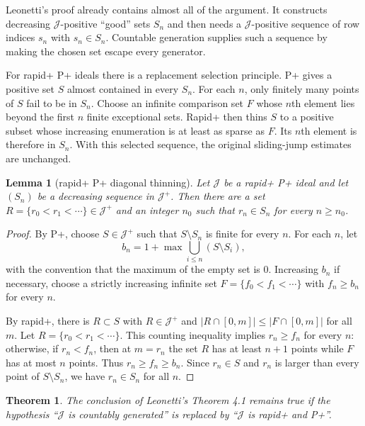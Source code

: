 \documentclass[11pt]{article}
\newtheorem{theorem}{Theorem}
\newtheorem{lemma}{Lemma}
\newcommand{\J}{\mathcal J}
\begin{document}
Leonetti's proof already contains almost all of the argument. It constructs
decreasing $\J$-positive ``good'' sets $S_n$ and then needs a $\J$-positive
sequence of row indices $s_n$ with $s_n\in S_n$. Countable generation supplies
such a sequence by making the chosen set escape every generator.

For rapid+ P+ ideals there is a replacement selection principle. P+ gives a
positive set $S$ almost contained in every $S_n$. For each $n$, only finitely
many points of $S$ fail to be in $S_n$. Choose an infinite comparison set $F$
whose $n$th element lies beyond the first $n$ finite exceptional sets. Rapid+
then thins $S$ to a positive subset whose increasing enumeration is at least as
sparse as $F$. Its $n$th element is therefore in $S_n$. With this selected
sequence, the original sliding-jump estimates are unchanged.

\begin{lemma}[rapid+ P+ diagonal thinning]\label{lem:thin}
Let $\J$ be a rapid+ P+ ideal and let $(S_n)$ be a decreasing sequence in
$\J^+$. Then there are a set $R=\{r_0<r_1<\cdots\}\in\J^+$ and an integer
$n_0$ such that $r_n\in S_n$ for every $n\ge n_0$.
\end{lemma}

\begin{proof}
By P+, choose $S\in\J^+$ such that $S\setminus S_n$ is finite for every $n$.
For each $n$, let
\[
  b_n=1+\max\bigcup_{i\le n}(S\setminus S_i),
\]
with the convention that the maximum of the empty set is $0$. Increasing
$b_n$ if necessary, choose a strictly increasing infinite set
$F=\{f_0<f_1<\cdots\}$ with $f_n\ge b_n$ for every $n$.

By rapid+, there is $R\subset S$ with $R\in\J^+$ and
$|R\cap[0,m]|\le |F\cap[0,m]|$ for all $m$. Let
$R=\{r_0<r_1<\cdots\}$. This counting inequality implies $r_n\ge f_n$ for every
$n$: otherwise, if $r_n<f_n$, then at $m=r_n$ the set $R$ has at least $n+1$
points while $F$ has at most $n$ points. Thus $r_n\ge f_n\ge b_n$. Since
$r_n\in S$ and $r_n$ is larger than every point of $S\setminus S_n$, we have
$r_n\in S_n$ for all $n$.
\end{proof}

\begin{theorem}
The conclusion of Leonetti's Theorem 4.1 remains true if the hypothesis
``$\J$ is countably generated'' is replaced by ``$\J$ is rapid+ and P+''.
\end{theorem}
\end{document}
